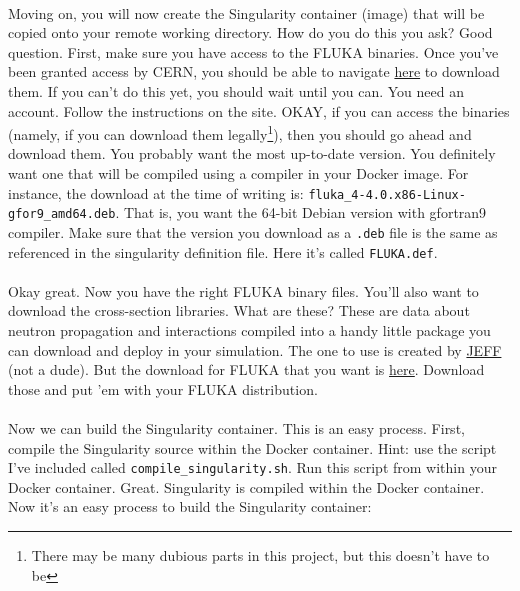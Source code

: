     \paragraph{}
    Moving on, you will now create the Singularity container (image) that will be copied onto your remote working directory. How do you do this you ask? Good question. First, make sure you have access to the FLUKA binaries. Once you've been granted access by CERN, you should be able to navigate \href{https://fluka.cern/download/latest-fluka-release}{here} to download them. If you can't do this yet, you should wait until you can. You need an account. Follow the instructions on the site. OKAY, if you can access the binaries (namely, if you can download them legally\footnote{There may be many dubious parts in this project, but this doesn't have to be}), then you should go ahead and download them. You probably want the most up-to-date version. You definitely want one that will be compiled using a compiler in your Docker image. For instance, the download at the time of writing is: \texttt{fluka\_4-4.0.x86-Linux-gfor9\_amd64.deb}. That is, you want the 64-bit Debian version with gfortran9 compiler. Make sure that the version you download as a \texttt{.deb} file is the same as referenced in the singularity definition file. Here it's called \texttt{FLUKA.def}. 

    \paragraph{}
    Okay great. Now you have the right FLUKA binary files. You'll also want to download the cross-section libraries. What are these? These are data about neutron propagation and interactions compiled into a handy little package you can download and deploy in your simulation. The one to use is created by \href{https://www.oecd-nea.org/dbdata/jeff/jeff33/}{JEFF} (not a dude). But the download for FLUKA that you want is \href{https://fluka.cern/download/neutron-data-libraries}{here}. Download those and put 'em with your FLUKA distribution.

    \paragraph{}
    Now we can build the Singularity container. This is an easy process. First, compile the Singularity source within the Docker container. Hint: use the script I've included called \texttt{compile\_singularity.sh}. Run this script from within your Docker container. Great. Singularity is compiled within the Docker container. Now it's an easy process to build the Singularity container:

